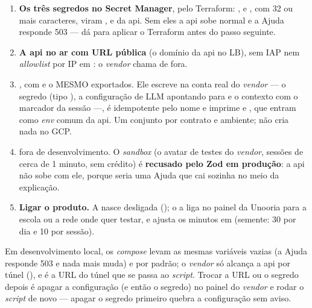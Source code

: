 \begin{enumerate}
  \item \textbf{Os três segredos no Secret Manager}, pelo Terraform:
    ,  e
    , com 32 ou mais caracteres, viram
    ,  e
     da api. Sem eles a api sobe normal e a Ajuda
    responde 503 --- dá para aplicar o Terraform antes do passo seguinte.
  \item \textbf{A api no ar com URL pública} (o domínio da api no LB), sem IAP
    nem \emph{allowlist} por IP em : o \emph{vendor} chama de fora.
  \item \textbf{ 
    }, com  e o MESMO
     exportados. Ele escreve na conta real do
    \emph{vendor} --- o segredo (tipo ), a configuração de LLM
    apontando para  e o contexto com o marcador da sessão
    ---, é idempotente pelo nome  e imprime
     e , que entram
    como \emph{env} comum da api. Um conjunto por contrato e ambiente; não cria
    nada no GCP.
  \item \textbf{} fora de desenvolvimento. O
    \emph{sandbox} (o avatar de testes do \emph{vendor}, sessões de cerca de 1
    minuto, sem crédito) é \textbf{recusado pelo Zod em produção}: a api não sobe
    com ele, porque seria uma Ajuda que cai sozinha no meio da explicação.
  \item \textbf{Ligar o produto.} A  nasce desligada
    (); o  a liga no
    painel da Unooria para a escola ou a rede onde quer testar, e ajusta os
    minutos em  (semente: 30 por dia e 10 por sessão).
\end{enumerate}

Em desenvolvimento local, os \emph{compose} levam as mesmas variáveis vazias (a
Ajuda responde 503 e nada mais muda) e  por padrão; o
\emph{vendor} só alcança a api por túnel (), e é a URL do túnel que
se passa ao \emph{script}. Trocar a URL ou o segredo depois é apagar a
configuração (e então o segredo) no painel do \emph{vendor} e rodar o \emph{script}
de novo --- apagar o segredo primeiro quebra a configuração sem aviso.

